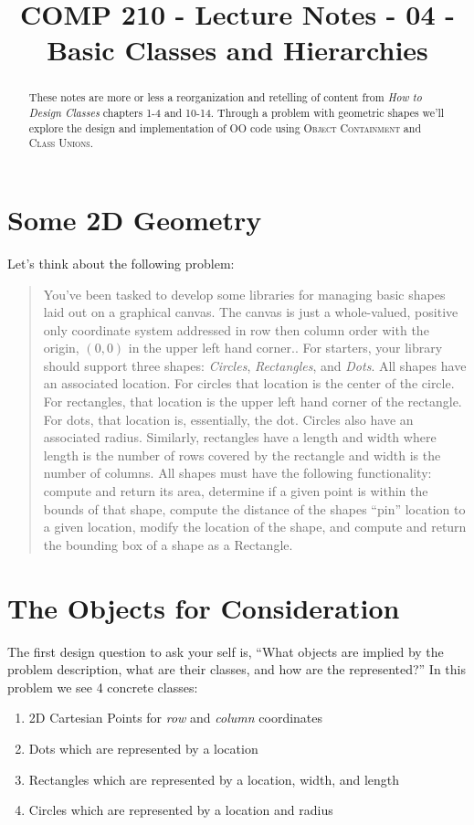 \documentclass[]{tufte-handout}
\title{COMP 210 - Lecture Notes - 04 - Basic Classes and Hierarchies}
\begin{document}
\maketitle

\begin{abstract}
These notes are more or less a reorganization and retelling of content from \textit{How to Design Classes} chapters 1-4 and 10-14. Through a problem with geometric shapes we'll explore the design and implementation of OO code using \textsc{Object Containment} and \textsc{Class Unions}.   
\end{abstract}

\section{Some 2D Geometry}

Let's think about the following problem:
\begin{quote}
You've been tasked to develop some libraries for managing basic shapes laid out on a graphical canvas. The canvas is just a whole-valued, positive only coordinate system addressed in row then column order with the origin, $(0,0)$ in the upper left hand corner.. For starters, your library should support three shapes: \textit{Circles}, \textit{Rectangles}, and \textit{Dots}. All shapes have an associated location. For circles that location is the center of the circle. For rectangles, that location is the upper left hand corner of the rectangle. For dots, that location is, essentially, the dot. Circles also have an associated radius. Similarly, rectangles have a length and width where length is the number of rows covered by the rectangle and width is the number of columns.  
All shapes must have the following functionality: compute and return its area, determine if a given point is within the bounds of that shape, compute the distance of the shapes ``pin'' location to a given location, modify the location of the shape, and compute and return the bounding box of a shape as a Rectangle.
\end{quote}

\section{The Objects for Consideration}

The first design question to ask your self is, ``What objects are implied by the problem description, what are their classes, and how are the represented?'' In this problem we see 4 concrete classes:
\begin{enumerate}
\item 2D Cartesian Points for \textit{row} and \textit{column} coordinates
\item Dots which are represented by a location
\item Rectangles which are represented by a location, width, and length
\item Circles which are represented by a location and radius
\end{enumerate}
\end{document}

